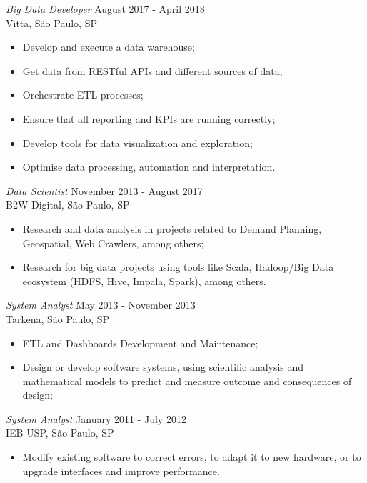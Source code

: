 \documentclass[margin, 10pt]{res} %
\begin{document}
\begin{resume}
{\sl Big Data Developer} \hfill August 2017 - April 2018 \\
Vitta, São Paulo, SP
\begin{itemize} \itemsep -2pt %
\item Develop and execute a data warehouse;
\item Get data from RESTful APIs and different sources of data;
\item Orchestrate ETL processes;
\item Ensure that all reporting and KPIs are running correctly;
\item Develop tools for data visualization and exploration;
\item Optimise data processing, automation and interpretation.
\end{itemize}

{\sl Data Scientist} \hfill November 2013 - August 2017 \\
B2W Digital, São Paulo, SP
\begin{itemize} \itemsep -2pt %
\item Research and data analysis in projects related to Demand Planning, Geospatial, Web Crawlers, among others;
\item Research for big data projects using tools like Scala, Hadoop/Big Data ecosystem (HDFS, Hive, Impala, Spark), among others.
\end{itemize}

{\sl System Analyst} \hfill May 2013 - November 2013 \\
Tarkena, São Paulo, SP
\begin{itemize} \itemsep -2pt %
\item ETL and Dashboards Development and Maintenance;
\item Design or develop software systems, using scientific analysis and mathematical models to predict and measure outcome and consequences of design;
\end{itemize}

{\sl System Analyst} \hfill January 2011 - July 2012 \\
IEB-USP, São Paulo, SP
\begin{itemize} \itemsep -2pt %
\item Modify existing software to correct errors, to adapt it to new hardware, or to upgrade interfaces and improve performance.
\end{itemize} 


\end{resume}
\end{document}
